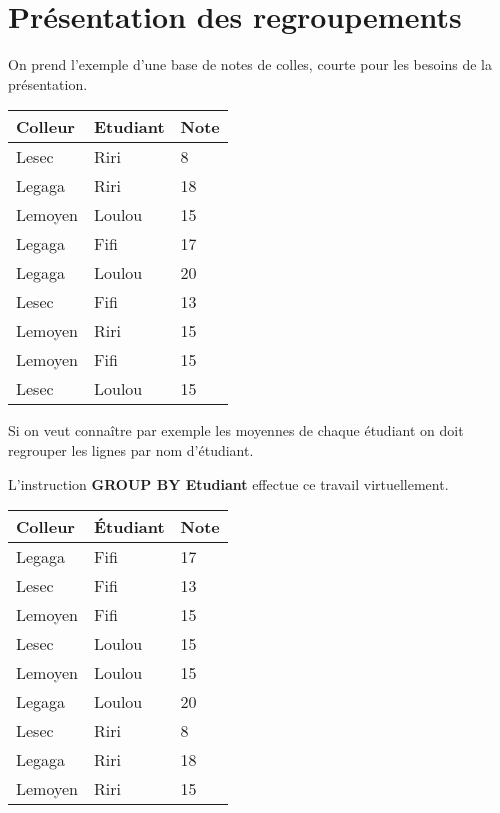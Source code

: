 \section{Présentation des regroupements}
\begin{minipage}[t]{0.45\linewidth}
On prend l'exemple d'une base de notes de colles, courte pour les besoins de la présentation.

\begin{center}
\begin{tabular}[t]{|l|l|l|}
\hline
\bf Colleur  & \bf Etudiant & \bf Note \\ 
\hline
Lesec&Riri&8\\
Legaga&Riri&18\\
Lemoyen&Loulou&15\\
Legaga&Fifi&17\\
Legaga&Loulou&20\\
Lesec&Fifi&13\\
Lemoyen&Riri&15\\
Lemoyen&Fifi&15\\
Lesec&Loulou&15\\
\hline
\end{tabular}
\end{center}
\end{minipage}
\hfill
\begin{minipage}[t]{0.45\linewidth}
Si on veut connaître par exemple les moyennes de chaque étudiant on doit regrouper les lignes par nom d'étudiant.

L'instruction {\bf GROUP BY Etudiant} effectue ce travail virtuellement.

\begin{center}
\begin{tabular}[t]{|l|l|l|}
\hline
\bf Colleur  & \bf Étudiant & \bf Note \\ 
\hline
Legaga&Fifi&17\\
Lesec&Fifi&13\\
Lemoyen&Fifi&15\\
\hline
Lesec&Loulou&15\\
Lemoyen&Loulou&15\\
Legaga&Loulou&20\\
\hline
Lesec&Riri&8\\
Legaga&Riri&18\\
Lemoyen&Riri&15\\
\hline
\end{tabular}
\end{center}
\end{minipage}

